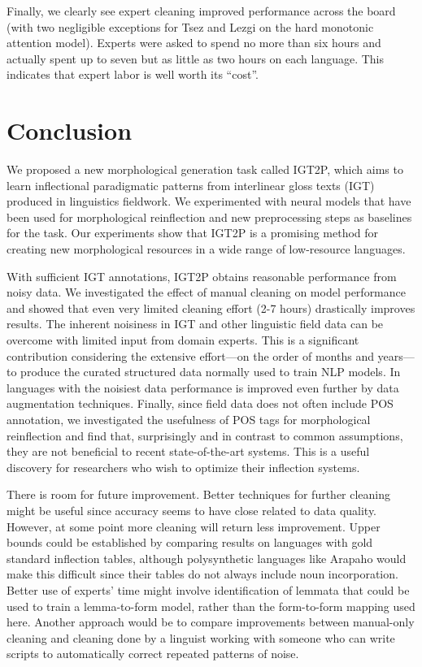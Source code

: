 Finally, we clearly see expert cleaning improved performance across the board (with two negligible exceptions for Tsez and Lezgi on the hard monotonic attention model). Experts were asked to spend no more than six hours and actually spent up to seven but as little as two hours on each language. This indicates that expert labor is well worth its ``cost''. 


\section{Conclusion}

We proposed a new morphological generation task called IGT2P, which aims to learn inflectional paradigmatic patterns from interlinear gloss texts (IGT) produced in linguistics fieldwork. We experimented with neural models that have been used for morphological reinflection and new preprocessing steps as baselines for the task. Our experiments show that IGT2P is a promising method for creating new morphological resources in a wide range of low-resource languages. 

With sufficient IGT annotations, IGT2P obtains reasonable performance from noisy data. 
We investigated the effect of manual cleaning on model performance and showed that even very limited cleaning effort (2-7 hours) drastically improves results. The inherent noisiness in IGT and other linguistic field data can be overcome with limited input from domain experts. This is a significant contribution considering the extensive effort---on the order of months and years---to produce the curated structured data normally used to train NLP models. 
In languages with the noisiest data performance is improved even further by data augmentation techniques.
Finally, since field data does not often include POS annotation, we investigated the usefulness of POS tags for morphological reinflection and find that, surprisingly and in contrast to common assumptions, they are not beneficial to recent state-of-the-art systems. This is a useful discovery for researchers who wish to optimize their inflection systems. 

There is room for future improvement. Better techniques for further cleaning might be useful since accuracy seems to have close related to data quality. However, at some point more cleaning will return less improvement. Upper bounds could be established by comparing results on languages with gold standard inflection tables, although polysynthetic languages like Arapaho would make this difficult since their tables do not always include noun incorporation. Better use of experts' time might involve identification of lemmata that could be used to train a lemma-to-form model, rather than the form-to-form mapping used here. Another approach would be to compare improvements between manual-only cleaning and cleaning done by a linguist working with someone who can write scripts to automatically correct repeated patterns of noise. 

